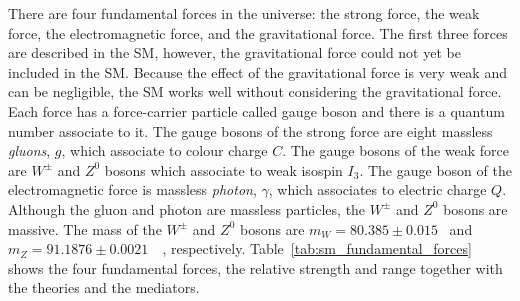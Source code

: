 
There are four fundamental forces in the universe: the strong force, the weak force, the electromagnetic force, and the gravitational force.
The first three forces are described in the SM, however, the gravitational force could not yet be included in the SM.
Because the effect of the gravitational force is very weak and can be negligible, the SM works well without considering the gravitational force.
Each force has a force-carrier particle called gauge boson and there is a quantum number associate to it.
The gauge bosons of the strong force are eight massless \textit{gluons}, $g$, which associate to colour charge $C$.
The gauge bosons of the weak force are $W^{\pm}$ and $Z^{0}$ bosons which associate to weak isospin $I_{3}$.
The gauge boson of the electromagnetic force is massless \textit{photon}, $\gamma$, which associates to electric charge $Q$.
Although the gluon and photon are massless particles, the $W^{\pm}$ and $Z^{0}$ bosons are massive.
The mass of the $W^{\pm}$ and $Z^{0}$ bosons are $m_{W}=80.385 \pm 0.015$~{\GeV} and $m_{Z}=91.1876 \pm 0.0021$~{\GeV}~\cite{PDG}, respectively.
Table~\ref{tab:sm_fundamental_forces} shows the four fundamental forces, the relative strength and range together with the theories and the mediators.

\begin{table}[htp]
\caption{The four fundamental forces with the relative strength, interaction range, describing theory, and the mediator with its mass.
The gravitational force is not a part of the SM and the graviton is a theoretical particle.}
\label{tab:sm_fundamental_forces}
\end{table}%

